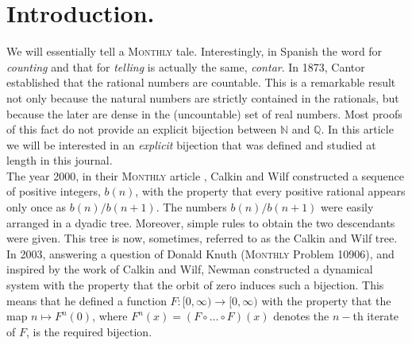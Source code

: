 \documentclass[letterpaper,10pt,reqno]{amsart}
\numberwithin{equation}{section}     %
\newcommand{\N}{\mathbb{N}}
\def\N{{\mathbb N}}
\def\Q{{\mathbb Q}}
\begin{document}
%



\section{Introduction.}


We will essentially tell a \textsc{Monthly}  tale. Interestingly, in Spanish the word for  {\it counting} and that for {\it telling} is actually the same, \emph{contar}. In 1873, Cantor established that the rational numbers are countable. This is a remarkable result not only because the natural numbers are strictly contained in the rationals, but because the later are dense in the (uncountable) set of real numbers. Most proofs of this fact do not provide an explicit bijection between $\N$ and $\Q$. In this article we will be interested in an \emph{explicit} bijection that was defined and studied at length in this journal. \\

The year 2000, in their \textsc{Monthly}  article \cite{cw}, Calkin and Wilf constructed a sequence of positive integers, $b(n)$, with the property that every positive rational appears only once as $b(n)/b(n+1)$. The numbers $b(n)/b(n+1)$ were easily arranged in a dyadic tree. Moreover,  simple rules to obtain the two descendants were given. This tree is now, sometimes, {{}{referred}} to as the Calkin and Wilf tree. In 2003,  answering a question of Donald Knuth (\textsc{Monthly}  Problem 10906), and inspired by the work of Calkin and Wilf,  Newman \cite{k} constructed a dynamical system with the property that the orbit of zero induces such a bijection. This means that he defined a function $F:[0,\infty) \to [0, \infty)$ with the property that the map $n \mapsto F^n(0)$, where $F^n(x)= (F \circ \dots \circ F)(x)$ denotes the $n-$th iterate of $F$, is the required bijection.\\
\end{document}
